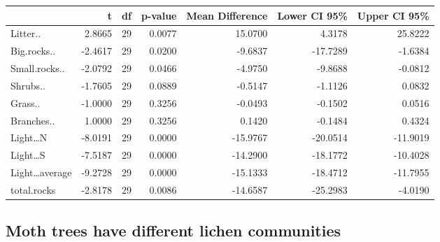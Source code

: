 \documentclass[]{article}
\newenvironment{Shaded}{\begin{snugshade}}{\end{snugshade}}
\newcommand{\KeywordTok}[1]{\textcolor[rgb]{0.13,0.29,0.53}{\textbf{#1}}}
\newcommand{\DataTypeTok}[1]{\textcolor[rgb]{0.13,0.29,0.53}{#1}}
\newcommand{\DecValTok}[1]{\textcolor[rgb]{0.00,0.00,0.81}{#1}}
\newcommand{\StringTok}[1]{\textcolor[rgb]{0.31,0.60,0.02}{#1}}
\newcommand{\NormalTok}[1]{#1}
\begin{document}
\begin{Shaded}
\end{Shaded}

\begin{longtable}[]{@{}lrrrrrr@{}}
\toprule
& t & df & p-value & Mean Difference & Lower CI 95\% & Upper CI
95\%\tabularnewline
\midrule
\endhead
Litter.. & 2.8665 & 29 & 0.0077 & 15.0700 & 4.3178 &
25.8222\tabularnewline
Big.rocks.. & -2.4617 & 29 & 0.0200 & -9.6837 & -17.7289 &
-1.6384\tabularnewline
Small.rocks.. & -2.0792 & 29 & 0.0466 & -4.9750 & -9.8688 &
-0.0812\tabularnewline
Shrubs.. & -1.7605 & 29 & 0.0889 & -0.5147 & -1.1126 &
0.0832\tabularnewline
Grass.. & -1.0000 & 29 & 0.3256 & -0.0493 & -0.1502 &
0.0516\tabularnewline
Branches.. & 1.0000 & 29 & 0.3256 & 0.1420 & -0.1484 &
0.4324\tabularnewline
Light\ldots{}N & -8.0191 & 29 & 0.0000 & -15.9767 & -20.0514 &
-11.9019\tabularnewline
Light\ldots{}S & -7.5187 & 29 & 0.0000 & -14.2900 & -18.1772 &
-10.4028\tabularnewline
Light\ldots{}average & -9.2728 & 29 & 0.0000 & -15.1333 & -18.4712 &
-11.7955\tabularnewline
total.rocks & -2.8178 & 29 & 0.0086 & -14.6587 & -25.2983 &
-4.0190\tabularnewline
\bottomrule
\end{longtable}

\subsection{Moth trees have different lichen
communities}\label{moth-trees-have-different-lichen-communities}
\end{document}
